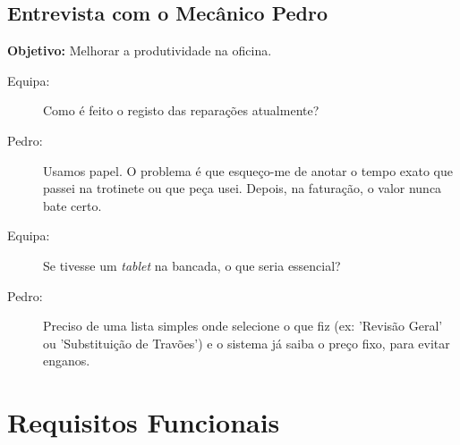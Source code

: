 \documentclass[a4paper,12pt]{scrreprt}
\begin{document}
\subsection{Entrevista com o Mecânico Pedro}
\textbf{Objetivo:} Melhorar a produtividade na oficina. 
\begin{description}
    \item[Equipa:] Como é feito o registo das reparações atualmente?
    \item[Pedro:] Usamos papel. O problema é que esqueço-me de anotar o tempo exato que passei na trotinete ou que peça usei. Depois, na faturação, o valor nunca bate certo.
    \item[Equipa:] Se tivesse um \textit{tablet} na bancada, o que seria essencial?
    \item[Pedro:] Preciso de uma lista simples onde selecione o que fiz (ex: 'Revisão Geral' ou 'Substituição de Travões') e o sistema já saiba o preço fixo, para evitar enganos.
\end{description}

\section{Requisitos Funcionais}
\end{document}
